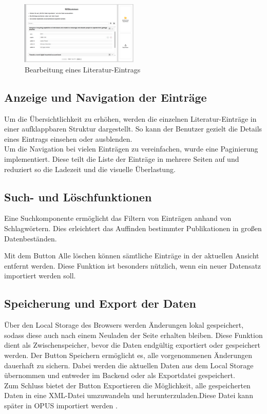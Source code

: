 \begin{figure}[h]
    \centering
    \includegraphics[width=0.5\textwidth]{Graphics/frontend.png}
    \caption{Bearbeitung eines Literatur-Eintrags}
    \label{fig:bearbeiten}
\end{figure}

\subsection{Anzeige und Navigation der Einträge}
Um die Übersichtlichkeit zu erhöhen, werden die einzelnen Literatur-Einträge in einer aufklappbaren
Struktur dargestellt. So kann der Benutzer gezielt die Details eines Eintrags einsehen oder ausblenden.\\

\noindent Um die Navigation bei vielen Einträgen zu vereinfachen, wurde eine Paginierung implementiert.
Diese teilt die Liste der Einträge in mehrere Seiten auf und reduziert so die Ladezeit und die visuelle Überlastung.

\subsection{Such- und Löschfunktionen}
Eine Suchkomponente ermöglicht das Filtern von Einträgen anhand von Schlagwörtern.
Dies erleichtert das Auffinden bestimmter Publikationen in großen Datenbeständen.

\noindent Mit dem Button \glqq Alle löschen\grqq{} können sämtliche Einträge in der aktuellen Ansicht entfernt werden.
Diese Funktion ist besonders nützlich, wenn ein neuer Datensatz importiert werden soll.

\subsection{Speicherung und Export der Daten}
Über den Local Storage des Browsers werden Änderungen lokal gespeichert,
sodass diese auch nach einem Neuladen der Seite erhalten bleiben.
Diese Funktion dient als Zwischenspeicher, bevor die Daten endgültig exportiert oder gespeichert werden.
Der Button \glqq Speichern\grqq{} ermöglicht es, alle vorgenommenen Änderungen dauerhaft zu sichern.
Dabei werden die aktuellen Daten aus dem Local Storage übernommen und entweder im Backend oder als Exportdatei gespeichert.\\

\noindent Zum Schluss  bietet der Button \glqq Exportieren\grqq{} die Möglichkeit,
alle gespeicherten Daten in eine XML-Datei umzuwandeln und herunterzuladen.Diese Datei kann später in OPUS importiert werden .
